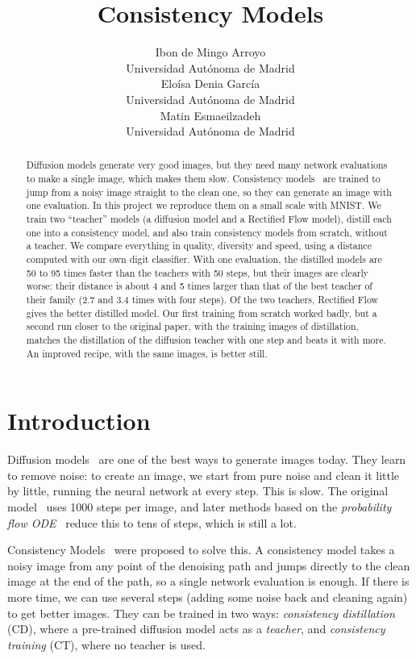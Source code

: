 \documentclass{article}
\title{Consistency Models}
\author{
Ibon de Mingo Arroyo \\
Universidad Autónoma de Madrid \\
\And
Eloísa Denia García \\
Universidad Autónoma de Madrid \\
\And
Matin Esmaeilzadeh \\
Universidad Autónoma de Madrid \\
}
\begin{document}
\maketitle

\begin{abstract}
Diffusion models generate very good images, but they need many network
evaluations to make a single image, which makes them slow. Consistency
models~\cite{song2023consistency} are trained to jump from a noisy image
straight to the clean one, so they can generate an image with one evaluation.
In this project we reproduce them on a small scale with MNIST. We train two
``teacher'' models (a diffusion model and a Rectified Flow model), distill each
one into a consistency model, and also train consistency models from scratch,
without a teacher. We compare everything in quality, diversity and speed, using
a distance computed with our own digit classifier. With one evaluation, the
distilled models are 50 to 95 times faster than the teachers with 50 steps, but
their images are clearly worse: their distance is about 4 and 5 times larger than that
of the best teacher of their family (2.7 and 3.4 times with four steps). Of the
two teachers, Rectified Flow gives the better distilled model. Our first training
from scratch worked badly, but a second run closer to the original paper, with
the training images of distillation, matches the distillation of the diffusion
teacher with one step and beats it with more. An improved recipe, with the
same images, is better still.
\end{abstract}

\section{Introduction}
\label{sec:introduction}

Diffusion models~\cite{ho2020ddpm,song2021sde} are one of the best ways to
generate images today. They learn to remove noise: to create an image, we start
from pure noise and clean it little by little, running the neural network at
every step. This is slow. The original model~\cite{ho2020ddpm} uses 1000 steps
per image, and later methods based on the \emph{probability flow
ODE}~\cite{song2021sde} reduce this to tens of steps, which is still a lot.

Consistency Models~\cite{song2023consistency} were proposed to solve this. A
consistency model takes a noisy image from any point of the denoising path and
jumps directly to the clean image at the end of the path, so a single network
evaluation is enough. If there is more time, we can use several steps (adding
some noise back and cleaning again) to get better images. They can be trained in
two ways: \emph{consistency distillation} (CD), where a pre-trained diffusion
model acts as a \emph{teacher}, and \emph{consistency training} (CT), where no
teacher is used.
\end{document}
